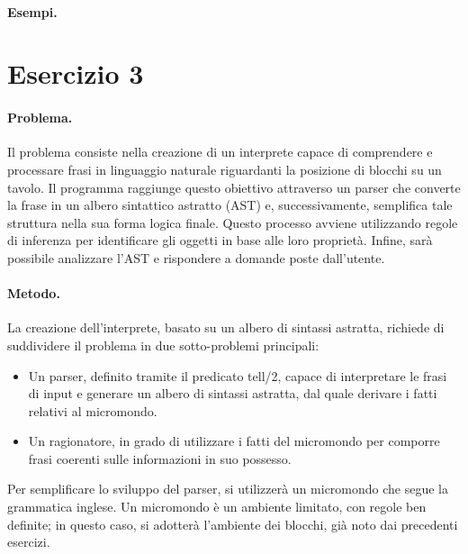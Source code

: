 \documentclass[12pt,twoside]{report}
\begin{document}
\paragraph{Esempi.} 


\cleardoublepage

\section*{Esercizio 3}

\paragraph{Problema.} Il problema consiste nella creazione di un interprete capace di comprendere e processare frasi in linguaggio naturale riguardanti la posizione di blocchi su un tavolo. Il programma raggiunge questo obiettivo attraverso un parser che converte la frase in un albero sintattico astratto (AST) e, successivamente, semplifica tale struttura nella sua forma logica finale. Questo processo avviene utilizzando regole di inferenza per identificare gli oggetti in base alle loro proprietà. Infine, sarà possibile analizzare l'AST e rispondere a domande poste dall'utente.

\paragraph{Metodo.} La creazione dell'interprete, basato su un albero di sintassi astratta, richiede di suddividere il problema in due sotto-problemi principali: \begin{itemize} 
\item Un parser, definito tramite il predicato tell/2, capace di interpretare le frasi di input e generare un albero di sintassi astratta, dal quale derivare i fatti relativi al micromondo. 
\item Un ragionatore, in grado di utilizzare i fatti del micromondo per comporre frasi coerenti sulle informazioni in suo possesso. 
\end{itemize}

Per semplificare lo sviluppo del parser, si utilizzerà un micromondo che segue la grammatica inglese. Un micromondo è un ambiente limitato, con regole ben definite; in questo caso, si adotterà l’ambiente dei blocchi, già noto dai precedenti esercizi.
\end{document}
